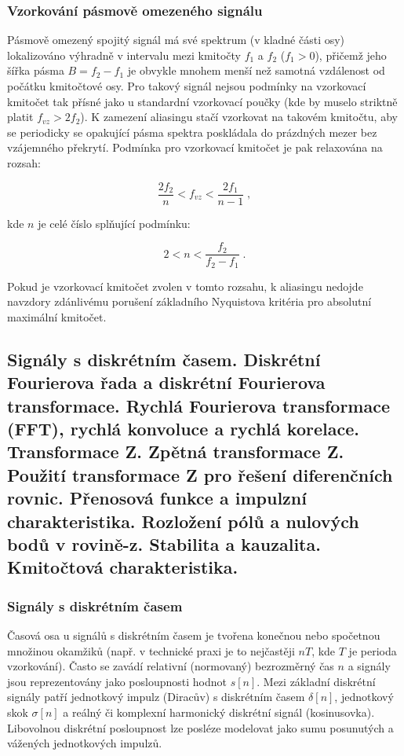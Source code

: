     \subsubsection{Vzorkování pásmově omezeného signálu} 
        Pásmově omezený spojitý signál má své spektrum (v  kladné části osy) lokalizováno výhradně v intervalu mezi kmitočty $f_1$ a $f_2$ ($f_1 > 0$), přičemž jeho šířka pásma $B = f_2 - f_1$ je obvykle mnohem menší než samotná vzdálenost od počátku kmitočtové osy. Pro takový signál nejsou podmínky na vzorkovací kmitočet tak přísné jako u standardní vzorkovací poučky (kde by muselo striktně platit $f_{vz} > 2f_2$). K zamezení aliasingu stačí vzorkovat na takovém kmitočtu, aby se periodicky se opakující pásma spektra poskládala do prázdných mezer bez vzájemného překrytí. Podmínka pro vzorkovací kmitočet je pak relaxována na rozsah:

        \begin{equation*}
        \frac{2f_2}{n} < f_{vz} < \frac{2f_1}{n-1} \;,
        \end{equation*}
        
        kde $n$ je celé číslo splňující podmínku:
        
        \begin{equation*}
        2 < n < \frac{f_2}{f_2 - f_1} \;.
        \end{equation*}
        
        Pokud je vzorkovací kmitočet zvolen v tomto rozsahu, k aliasingu nedojde navzdory zdánlivému porušení základního Nyquistova kritéria pro absolutní maximální kmitočet.
\subsection{Signály s diskrétním časem. Diskrétní Fourierova řada a diskrétní Fourierova transformace. Rychlá Fourierova transformace (FFT), rychlá konvoluce a rychlá korelace. Transformace Z. Zpětná transformace Z. Použití transformace Z pro řešení diferenčních rovnic. Přenosová funkce a impulzní charakteristika. Rozložení pólů a nulových bodů v rovině-z. Stabilita a kauzalita. Kmitočtová charakteristika.}
    \subsubsection{Signály s diskrétním časem}
        Časová osa u signálů s diskrétním časem je tvořena konečnou nebo spočetnou množinou okamžiků (např. v technické praxi je to nejčastěji $nT$, kde $T$ je perioda vzorkování). Často se zavádí relativní (normovaný) bezrozměrný čas $n$ a signály jsou reprezentovány jako posloupnosti hodnot $s[n]$. Mezi základní diskrétní signály patří jednotkový impulz (Diracův) s diskrétním časem $\delta[n]$, jednotkový skok $\sigma[n]$ a reálný či komplexní harmonický diskrétní signál (kosinusovka). Libovolnou diskrétní posloupnost lze posléze modelovat jako sumu posunutých a vážených jednotkových impulzů.
